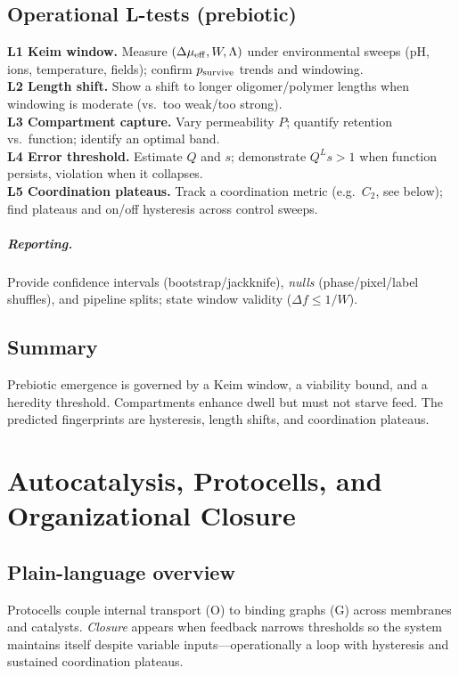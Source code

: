 \documentclass[12pt,a4paper,oneside]{scrreprt}
\begin{document}
\section{Operational L-tests (prebiotic)}\label{sec:life-tests}
\textbf{L1 Keim window.} Measure $(\Delta\mu_{\rm eff},W,\Lambda)$ under environmental sweeps (pH, ions, temperature, fields); confirm $p_{\rm survive}$ trends and windowing.\\
\textbf{L2 Length shift.} Show a shift to longer oligomer/polymer lengths when windowing is moderate (vs.\ too weak/too strong).\\
\textbf{L3 Compartment capture.} Vary permeability $P$; quantify retention vs.\ function; identify an optimal band.\\
\textbf{L4 Error threshold.} Estimate $Q$ and $s$; demonstrate $Q^L s>1$ when function persists, violation when it collapses.\\
\textbf{L5 Coordination plateaus.} Track a coordination metric (e.g.\ $C_2$, see below); find plateaus and on/off hysteresis across control sweeps.

\paragraph{Reporting.}
Provide confidence intervals (bootstrap/jackknife), \emph{nulls} (phase/pixel/label shuffles), and pipeline splits; state window validity ($\Delta f\le 1/W$).

\section*{Summary}
Prebiotic emergence is governed by a Keim window, a viability bound, and a heredity threshold. 
Compartments enhance dwell but must not starve feed. 
The predicted fingerprints are hysteresis, length shifts, and coordination plateaus.

\chapter{Autocatalysis, Protocells, and Organizational Closure}\label{ch:life-closure}

\section*{Plain-language overview}
Protocells couple internal transport (O) to binding graphs (G) across membranes and catalysts. 
\emph{Closure} appears when feedback narrows thresholds so the system maintains itself despite variable inputs—operationally a loop with hysteresis and sustained coordination plateaus.
\end{document}
